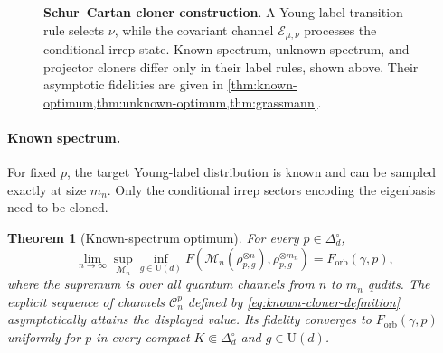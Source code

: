 \documentclass[11pt]{article}
\newtheorem{theorem}{Theorem}[section]
\theoremstyle{remark}
\theoremstyle{plain}
\newcommand{\cC}{\mathcal C}
\newcommand{\cE}{\mathcal E}
\newcommand{\cM}{\mathcal M}
\newcommand{\U}{\mathrm U}
\newcommand{\ot}{\otimes}
\newcommand{\Forb}{F_{\mathrm{orb}}}
\newcommand{\Fcl}{F_{\mathrm{cl}}}
\begin{document}
\begin{figure}[!tbp]
{%
}
\caption{\textbf{Schur--Cartan cloner construction}.  A Young-label transition rule
  selects \(\nu\), while the covariant channel \(\cE_{\mu,\nu}\) processes
  the conditional irrep state.  Known-spectrum, unknown-spectrum, and
  projector cloners differ only in their label rules, shown above. Their
  asymptotic fidelities are given in
  \cref{thm:known-optimum,thm:unknown-optimum,thm:grassmann}.}
\label{fig:schur-cartan-cloner}
\end{figure}

\paragraph{Known spectrum.}
For fixed \(p\), the target Young-label distribution is known and can be
sampled exactly at size \(m_n\). Only the conditional irrep
sectors encoding the eigenbasis need to be cloned.

\begin{theorem}[Known-spectrum optimum]\label{thm:known-optimum}
For every \(p\in\Delta_d^\circ\),
\begin{equation}\label{eq:known-optimum}
  \lim_{n\to\infty}
  \sup_{\cM_n}\inf_{g\in\U(d)}
  F\!\left(\cM_n(\rho_{p,g}^{\ot n}),\rho_{p,g}^{\ot m_n}\right)
  =\Forb(\gamma,p),
\end{equation}
where the supremum is over all quantum channels from \(n\) to \(m_n\)
qudits.  The explicit sequence of channels \(\cC_n^p\) defined by
\cref{eq:known-cloner-definition} asymptotically attains the displayed value.
Its fidelity converges to \(\Forb(\gamma,p)\) uniformly for \(p\) in
every compact \(K\Subset\Delta_d^\circ\) and \(g\in\U(d)\).
\end{theorem}
\end{document}
